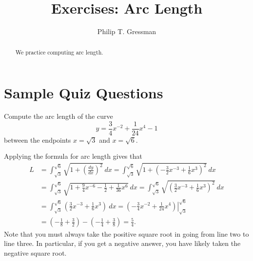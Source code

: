 \documentclass{ximera}
\title{Exercises: Arc Length}
\author{Philip T. Gressman}
\begin{document}
\begin{abstract}
We practice computing arc length.
\end{abstract}
\maketitle


\section*{Sample Quiz Questions}

\begin{question}%

Compute the arc length of the curve \[y = \frac{3}{4}x^{-2} + \frac{1}{24}x^{4} - 1\] between the endpoints \(x = \sqrt{3}\) and \(x = \sqrt{6}\).
\begin{multiplechoice}
\end{multiplechoice}
\begin{feedback}
Applying the formula for arc length gives that
\[
\begin{aligned}
L & = \int_{\sqrt{3}}^{\sqrt{6}} \sqrt{1 + \left( \frac{dy}{dx} \right)^2}~dx 
   = \int_{\sqrt{3}}^{\sqrt{6}} \sqrt{1 + \left( -\frac{3}{2}x^{-3} + \frac{1}{6}x^{3} \right)^2}~dx \\
  & = \int_{\sqrt{3}}^{\sqrt{6}} \sqrt{1 + \frac{9}{4}x^{-6} - \frac{1}{2} + \frac{1}{36}x^{6}} ~ dx 
   = \int_{\sqrt{3}}^{\sqrt{6}} \sqrt{ \left( \frac{3}{2}x^{-3} + \frac{1}{6}x^{3} \right)^2} ~ dx \\
  & = \int_{\sqrt{3}}^{\sqrt{6}} \left( \frac{3}{2}x^{-3} + \frac{1}{6}x^{3} \right) ~ dx 
   = \left.  \left( -\frac{3}{4}x^{-2} + \frac{1}{24}x^{4} \right) \right|_{\sqrt{3}}^{\sqrt{6}} \\
  & =  \left( -\frac{1}{8} + \frac{3}{2} \right) - \left( -\frac{1}{4} + \frac{3}{8} \right) 
   = \frac{5}{4}.
\end{aligned}
\]
Note that you must always take the positive square root in going from line two to line three. In particular, if you get a negative answer, you have likely taken the negative square root.
\end{feedback}

\end{question}
\end{document}
